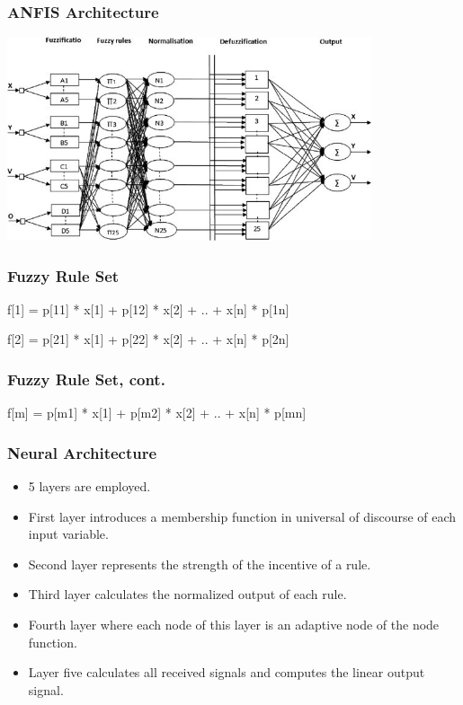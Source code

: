 \documentclass{beamer}
\begin{document}
   \begin{frame}
      \frametitle{ANFIS Architecture}
      \includegraphics[height=6cm]{neuro_fuzzy_architecture}
   \end{frame}

   \begin{frame}
      \frametitle{Fuzzy Rule Set}
      \begin{algorithm}[H]
         {
            f[1] = p[11] * x[1] + p[12] * x[2] + .. + x[n] * p[1n]
         } 
         \caption{Fuzzy Rule Set 1} 
      \end{algorithm}
      \begin{algorithm}[H]
         {
            f[2] = p[21] * x[1] + p[22] * x[2] + .. + x[n] * p[2n]
         } 
         \caption{Fuzzy Rule Set 2} 
      \end{algorithm}
   \end{frame}

   \begin{frame}
      \frametitle{Fuzzy Rule Set, cont.}
      \begin{algorithm}[H]
         {
            f[m] = p[m1] * x[1] + p[m2] * x[2] + .. + x[n] * p[mn]
         } 
         \caption{Fuzzy Rule Set M} 
      \end{algorithm}
   \end{frame}

   \begin{frame}
      \frametitle{Neural Architecture}
      \begin{itemize}
         \item 5 layers are employed.
         \item First layer introduces a  membership  function  in  universal  of  discourse  of  each input variable.
         \item Second layer represents the strength of the incentive of a rule.
         \item Third layer calculates the normalized output of each rule.
         \item Fourth layer where each node of this layer is an adaptive node of the node function.
         \item Layer five calculates all received signals and computes the linear output signal.
      \end{itemize}
   \end{frame}
\end{document}
